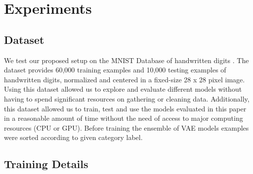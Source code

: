 \documentclass{article}
\begin{document}
\section{Experiments}
\label{sec:experiments}
\subsection{Dataset}

We test our proposed setup on the MNIST Database of handwritten digits \cite{LeCun}. The dataset provides 60,000 training examples and 10,000 testing examples of handwritten digits, normalized and centered in a fixed-size 28 x 28 pixel image. Using this dataset allowed us to explore and evaluate different models without having to spend significant resources on gathering or cleaning data. Additionally, this dataset allowed us to train, test and use the models evaluated in this paper in a reasonable amount of time without the need of access to major computing resources (CPU or GPU). Before training the ensemble of VAE models examples were sorted according to given category label.

\subsection{Training Details}
\end{document}
